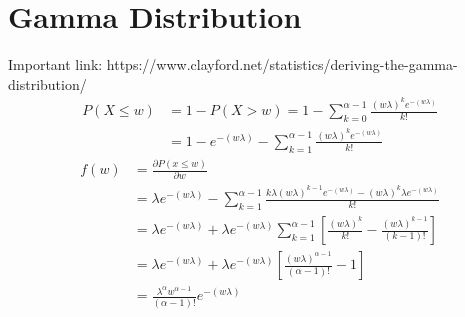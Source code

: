 \documentclass{article}
\begin{document}
\section{Gamma Distribution}
Important link: https://www.clayford.net/statistics/deriving-the-gamma-distribution/
\begin{equation}
\begin{split}
    P(X\leq w)&=1-P(X>w)=1-\sum_{k=0}^{\alpha -1}\frac{(w\lambda)^ke^{-(w\lambda)}}{k!}\\
    &=1-e^{-(w\lambda)}-\sum_{k=1}^{\alpha-1}\frac{(w\lambda)^ke^{-(w\lambda)}}{k!}
\end{split}
\end{equation}
\begin{equation}
\begin{split}
    f(w)&=\frac{\partial P(x\leq w)}{\partial w}\\
    &=\lambda e^{-(w\lambda)}-\sum_{k=1}^{\alpha-1}\frac{k\lambda (w\lambda)^{k-1}e^{-(w\lambda)}-(w\lambda)^{k}\lambda e^{-(w\lambda)}}{k!}\\
    &=\lambda e^{-(w\lambda)}+\lambda e^{-(w\lambda)}\sum_{k=1}^{\alpha-1}\left[\frac{(w\lambda)^{k}}{k!}-\frac{(w\lambda)^{k-1}}{(k-1)!}\right]\\
    &=\lambda e^{-(w\lambda)}+\lambda e^{-(w\lambda)}\left[ \frac{(w\lambda)^{\alpha-1}}{(\alpha-1)!}-1\right]\\
    &=\frac{\lambda^{\alpha}w^{\alpha-1}}{(\alpha-1)!}e^{-(w\lambda)}
\end{split}
\end{equation}
\end{document}
